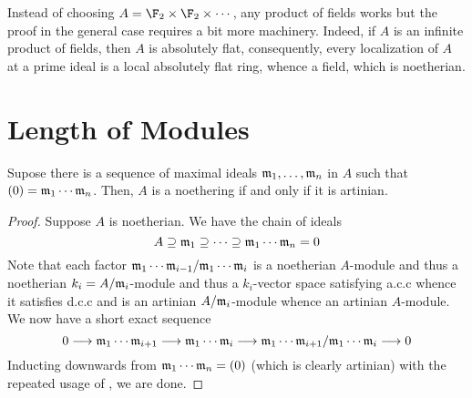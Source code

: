 \begin{remark}
    Instead of choosing $A = \F_2\times\F_2\times\cdots$, any product of fields works but the proof in the general case requires a bit more machinery. Indeed, if $A$ is an infinite product of fields, then $A$ is absolutely flat, consequently, every localization of $A$ at a prime ideal is a local absolutely flat ring, whence a field, which is noetherian.
\end{remark}

\section{Length of Modules}


\begin{lemma}
    Supose there is a sequence of maximal ideals $\mathfrak m_1,\ldots,\mathfrak m_n$ in $A$ such that $(0) = \mathfrak m_1\cdots\mathfrak m_n$. Then, $A$ is a noethering if and only if it is artinian.
\end{lemma}
\begin{proof}
    Suppose $A$ is noetherian. We have the chain of ideals 
    \begin{equation*}
        A\supseteq\mathfrak m_1\supseteq\dots\supseteq\mathfrak m_1\cdots\mathfrak m_n = 0
    \end{equation*}
    Note that each factor $\mathfrak m_1\cdots\mathfrak m_{i - 1}/\mathfrak m_1\cdots\mathfrak m_i$ is a noetherian $A$-module and thus a noetherian $k_i = A/\mathfrak m_i$-module and thus a $k_i$-vector space satisfying a.c.c whence it satisfies d.c.c and is an artinian $A/\mathfrak m_i$-module whence an artinian $A$-module. We now have a short exact sequence 
    \begin{equation*}
        0\longrightarrow\mathfrak m_1\cdots\mathfrak m_{i + 1}\longrightarrow\mathfrak m_1\cdots\mathfrak m_i\longrightarrow\mathfrak m_1\cdots\mathfrak m_{i + 1}/\mathfrak m_1\cdots\mathfrak m_i\longrightarrow 0
    \end{equation*}
    Inducting downwards from $\mathfrak m_1\cdots\mathfrak m_n = (0)$ (which is clearly artinian) with the repeated usage of , we are done.
\end{proof}

